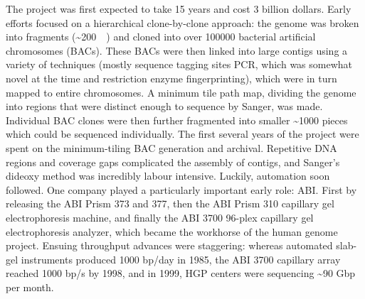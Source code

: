 The project was first expected to take 15 years and cost 3 billion dollars. Early efforts focused on a hierarchical clone-by-clone approach: the genome was broken into fragments (\textasciitilde\SI{200}{\kilo\base}) and cloned into over \num{100000} bacterial artificial chromosomes (BACs). These BACs were then linked into large contigs using a variety of techniques (mostly sequence tagging sites PCR, which was somewhat novel at the time and restriction enzyme fingerprinting), which were in turn mapped to entire chromosomes. A minimum tile path map, dividing the genome into regions that were distinct enough to sequence by Sanger, was made. Individual BAC clones were then further fragmented into smaller \textasciitilde\SI{1000}{\bp} pieces which could be sequenced individually. The first several years of the project were spent on the minimum-tiling BAC generation and archival. Repetitive DNA regions and coverage gaps complicated the assembly of contigs, and Sanger's dideoxy method was incredibly labour intensive. Luckily, automation soon followed. One company played a particularly important early role: ABI. First by releasing the ABI Prism 373 and 377, then the ABI Prism 310 capillary gel electrophoresis machine, and finally the ABI 3700 96-plex capillary gel electrophoresis analyzer, which became the workhorse of the human genome project. Ensuing throughput advances were staggering: whereas automated slab-gel instruments produced \num{1000} bp/day in 1985, the ABI 3700 capillary array reached \num{1000} bp/s by 1998, and in 1999, HGP centers were sequencing \textasciitilde90 Gbp per month.


